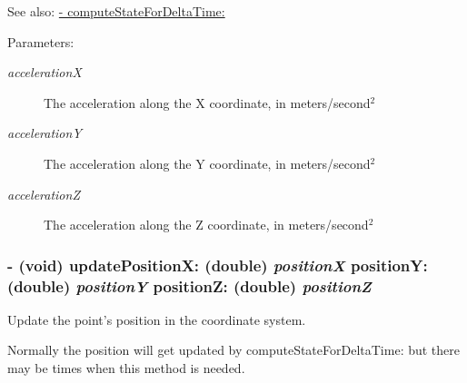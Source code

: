\begin{Desc}
\item[See also:]\hyperlink{interface_i_m_s_r_point_object_ae14396d83b2edd2f34b0bfb0f35a501}{- computeStateForDeltaTime:}\end{Desc}
\begin{Desc}
\item[Parameters:]
\begin{description}
\item[{\em accelerationX}]The acceleration along the X coordinate, in meters/second$^{\mbox{2}}$  \item[{\em accelerationY}]The acceleration along the Y coordinate, in meters/second$^{\mbox{2}}$  \item[{\em accelerationZ}]The acceleration along the Z coordinate, in meters/second$^{\mbox{2}}$  \end{description}
\end{Desc}
\hypertarget{interface_i_m_s_r_point_object_151a5fa0c67135b90a0de70b061276c3}{
\subsubsection[{updatePositionX:positionY:positionZ:}]{\setlength{\rightskip}{0pt plus 5cm}- (void) updatePositionX: (double) {\em positionX}\/ positionY: (double) {\em positionY}\/ positionZ: (double) {\em positionZ}}}
\label{interface_i_m_s_r_point_object_151a5fa0c67135b90a0de70b061276c3}


Update the point's position in the coordinate system. 

Normally the position will get updated by computeStateForDeltaTime: but there may be times when this method is needed.

